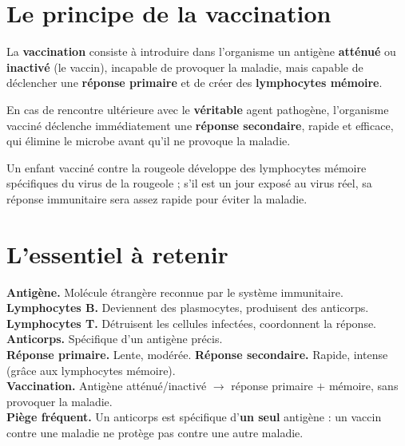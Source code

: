 \section{Le principe de la vaccination}

\begin{definition}[Vaccination]
La \textbf{vaccination} consiste à introduire dans l'organisme un antigène
\textbf{atténué} ou \textbf{inactivé} (le vaccin), incapable de provoquer la maladie, mais
capable de déclencher une \textbf{réponse primaire} et de créer des \textbf{lymphocytes
mémoire}.
\end{definition}

\begin{propriete}
En cas de rencontre ultérieure avec le \textbf{véritable} agent pathogène, l'organisme
vacciné déclenche immédiatement une \textbf{réponse secondaire}, rapide et efficace, qui
élimine le microbe avant qu'il ne provoque la maladie.
\end{propriete}

\begin{exemple}
Un enfant vacciné contre la rougeole développe des lymphocytes mémoire spécifiques du
virus de la rougeole ; s'il est un jour exposé au virus réel, sa réponse immunitaire sera
assez rapide pour éviter la maladie.
\end{exemple}

\section{L'essentiel à retenir}

\begin{synthese}
\textbf{Antigène.} Molécule étrangère reconnue par le système immunitaire.\\[4pt]
\textbf{Lymphocytes B.} Deviennent des plasmocytes, produisent des anticorps.
\textbf{Lymphocytes T.} Détruisent les cellules infectées, coordonnent la réponse.\\[4pt]
\textbf{Anticorps.} Spécifique d'un antigène précis.\\[4pt]
\textbf{Réponse primaire.} Lente, modérée. \textbf{Réponse secondaire.} Rapide, intense
(grâce aux lymphocytes mémoire).\\[4pt]
\textbf{Vaccination.} Antigène atténué/inactivé $\to$ réponse primaire $+$ mémoire, sans
provoquer la maladie.\\[4pt]
\textbf{Piège fréquent.} Un anticorps est spécifique d'\textbf{un seul} antigène : un
vaccin contre une maladie ne protège pas contre une autre maladie.
\end{synthese}

